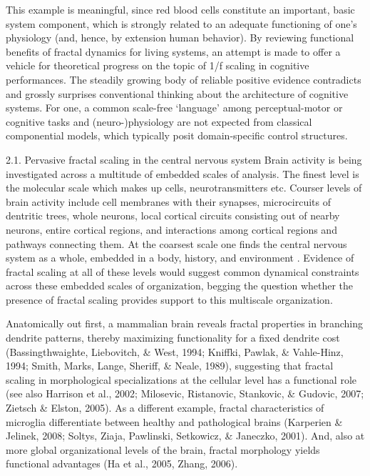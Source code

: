 \documentclass[12pt,]{book}
\begin{document}
This example is meaningful, since red blood cells constitute an important, basic system component, which is strongly related to an adequate functioning of one's physiology (and, hence, by extension human behavior). By reviewing functional benefits of fractal dynamics for living systems, an attempt is made to offer a vehicle for theoretical progress on the topic of 1/f scaling in cognitive performances. The steadily growing body of reliable positive evidence contradicts and grossly surprises conventional thinking about the architecture of cognitive systems. For one, a common scale-free `language' among perceptual-motor or cognitive tasks and (neuro-)physiology are not expected from classical componential models, which typically posit domain-specific control structures.

2.1. Pervasive fractal scaling in the central nervous system
Brain activity is being investigated across a multitude of embedded scales of analysis. The finest level is the molecular scale which makes up cells, neurotransmitters etc. Courser levels of brain activity include cell membranes with their synapses, microcircuits of dentritic trees, whole neurons, local cortical circuits consisting out of nearby neurons, entire cortical regions, and interactions among cortical regions and pathways connecting them. At the coarsest scale one finds the central nervous system as a whole, embedded in a body, history, and environment . Evidence of fractal scaling at all of these levels would suggest common dynamical constraints across these embedded scales of organization, begging the question whether the presence of fractal scaling provides support to this multiscale organization.

Anatomically out first, a mammalian brain reveals fractal properties in branching dendrite patterns, thereby maximizing functionality for a fixed dendrite cost (Bassingthwaighte, Liebovitch, \& West, 1994; Kniffki, Pawlak, \& Vahle-Hinz, 1994; Smith, Marks, Lange, Sheriff, \& Neale, 1989), suggesting that fractal scaling in morphological specializations at the cellular level has a functional role (see also Harrison et al., 2002; Milosevic, Ristanovic, Stankovic, \& Gudovic, 2007; Zietsch \& Elston, 2005). As a different example, fractal characteristics of microglia differentiate between healthy and pathological brains (Karperien \& Jelinek, 2008; Soltys, Ziaja, Pawlinski, Setkowicz, \& Janeczko, 2001). And, also at more global organizational levels of the brain, fractal morphology yields functional advantages (Ha et al., 2005, Zhang, 2006).
\end{document}
